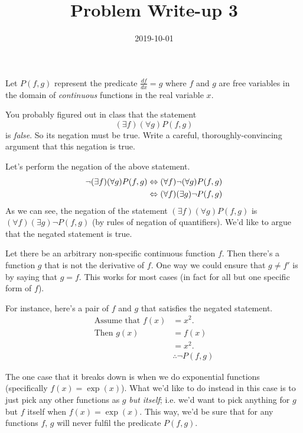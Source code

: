 \documentclass[a4paper,12pt]{article}
\title{Problem Write-up 3}
\date{2019-10-01}
\begin{document}
    \begin{problem}
        Let \(P(f,g)\) represent the predicate \(\frac{df}{dx} = g\) where \(f\) and \(g\) are free variables in the domain of \emph{continuous} functions in the real variable \(x\).

        You probably figured out in class that the statement \[(\exists f)(\forall g) P(f,g)\] is \emph{false}. So its negation must be true. Write a careful, thoroughly-convincing argument that this negation is true.

    \end{problem}
    \begin{answer}
        Let's perform the negation of the above statement.
        \begin{align*}
            \neg (\exists f)(\forall g) P(f,g) &\Leftrightarrow (\forall f) \neg (\forall g) P(f,g) \\
            &\Leftrightarrow (\forall f) (\exists g) \neg P(f,g)
        \end{align*}
        As we can see, the negation of the statement \((\exists f)(\forall g) P(f,g)\) is \((\forall f) (\exists g) \neg P(f,g)\) (by rules of negation of quantifiers). We'd like to argue that the negated statement is true.

        Let there be an arbitrary non-specific continuous function \(f\). Then there's a function \(g\) that is not the derivative of \(f\). One way we could ensure that \(g \not= f'\) is by saying that \(g = f\). This works for most cases (in fact for all but one specific form of \(f\)).

        For instance, here's a pair of \(f\) and \(g\) that satisfies the negated statement.
        \begin{align*}
            \text{Assume that } f(x) &= x^2. \\
            \text{Then } g(x) &= f(x) \\
            &= x^2. \\
            &\therefore \neg P(f,g)
        \end{align*}

        The one case that it breaks down is when we do exponential functions (specifically \(f(x) = \exp(x)\)). What we'd like to do instead in this case is to just pick any other functions as \(g\) \emph{but itself}; i.e. we'd want to pick anything for \(g\) but \(f\) itself when \(f(x) = \exp(x)\). This way, we'd be sure that for any functions \(f\), \(g\) will never fulfil the predicate \(P(f,g)\).
    \end{answer}
\end{document}
